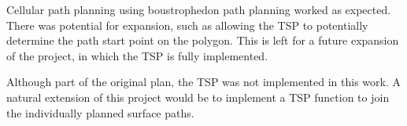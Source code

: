 Cellular path planning using boustrophedon path planning worked as expected.
There was potential for expansion, such as allowing the TSP to potentially determine the path start point on the polygon.
This is left for a future expansion of the project, in which the TSP is fully implemented.

Although part of the original plan, the TSP was not implemented in this work.
A natural extension of this project would be to implement a TSP function to join the individually planned surface paths.

